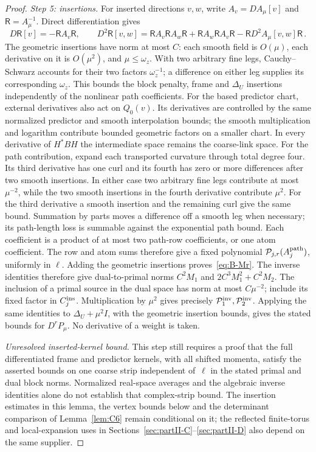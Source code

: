 \begin{proof}
\emph{Step 5: insertions.} For inserted directions $v,w$, write $A_v=DA_\mu[v]$ and $\mathsf R=A_\mu^{-1}$. Direct differentiation gives
\begin{equation*}
D\mathsf R[v]=-\mathsf RA_v\mathsf R,\qquad D^2\mathsf R[v,w]=\mathsf RA_v\mathsf RA_w\mathsf R+\mathsf RA_w\mathsf RA_v\mathsf R-\mathsf RD^2A_\mu[v,w]\mathsf R\,.
\end{equation*}
The geometric insertions have norm at most $C$: each smooth field is $O(\mu)$, each derivative on it is $O(\mu^2)$, and $\mu\le\omega_z$. With two arbitrary fine legs, Cauchy--Schwarz accounts for their two factors $\omega_z^{-1}$; a difference on either leg supplies its corresponding $\omega_z$. This bounds the block penalty, frame and $\Delta_U$ insertions independently of the nonlinear path coefficients. For the based predictor chart, external derivatives also act on $Q_0(v)$. Its derivatives are controlled by the same normalized predictor and smooth interpolation bounds; the smooth multiplication and logarithm contribute bounded geometric factors on a smaller chart. In every derivative of $H^*BH$ the intermediate space remains the coarse-link space. For the path contribution, expand each transported curvature through total degree four. Its third derivative has one curl and its fourth has zero or more differences after two smooth insertions. In either case two arbitrary fine legs contribute at most $\mu^{-2}$, while the two smooth insertions in the fourth derivative contribute $\mu^2$. For the third derivative a smooth insertion and the remaining curl give the same bound. Summation by parts moves a difference off a smooth leg when necessary; its path-length loss is summable against the exponential path bound. Each coefficient is a product of at most two path-row coefficients, or one atom coefficient. The row and atom sums therefore give a fixed polynomial $\mathcal P_{j,r}(A_j^{\rm path})$, uniformly in $\ell$. Adding the geometric insertions proves~\eqref{eq:B-Mr}. The inverse identities therefore give dual-to-primal norms $C^2M_1$ and $2C^3M_1^2+C^2M_2$. The inclusion of a primal source in the dual space has norm at most $C\mu^{-2}$; include its fixed factor in $C_j^{\rm ins}$. Multiplication by $\mu^2$ gives precisely $\mathcal P^{\rm inv}_1,\mathcal P^{\rm inv}_2$. Applying the same identities to $\Delta_U+\mu^2I$, with the geometric insertion bounds, gives the stated bounds for $D^rP_\mu$. No derivative of a weight is taken.

\emph{Unresolved inserted-kernel bound.} This step still requires a proof that the full differentiated frame and predictor kernels, with all shifted momenta, satisfy the asserted bounds on one coarse strip independent of~$\ell$ in the stated primal and dual block norms. Normalized real-space averages and the algebraic inverse identities alone do not establish that complex-strip bound. The insertion estimates in this lemma, the vertex bounds below and the determinant comparison of Lemma~\ref{lem:C6} remain conditional on it; the reflected finite-torus and local-expansion uses in Sections~\ref{sec:partII-C}--\ref{sec:partII-D} also depend on the same supplier.


\end{proof}
